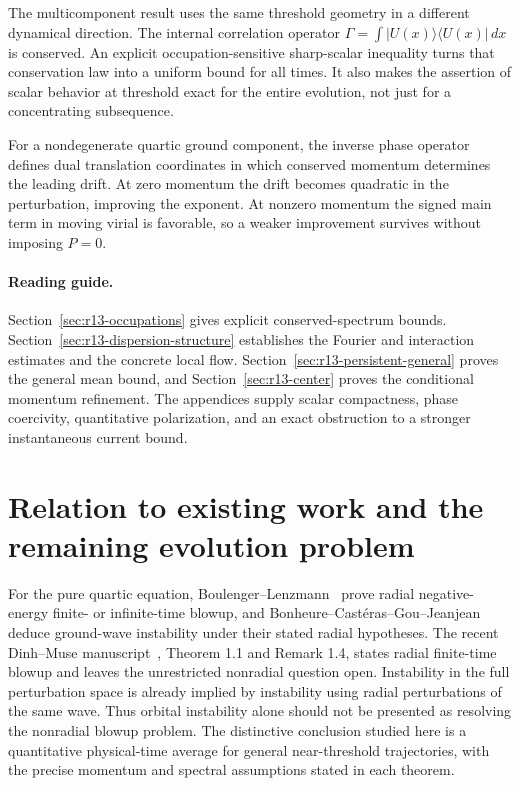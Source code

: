 \documentclass[11pt,a4paper]{article}
\theoremstyle{remark}\newtheorem{remark}[theorem]{Remark}
\begin{document}
The multicomponent result uses the same threshold geometry in a
different dynamical direction. The internal correlation operator
$\Gamma=\int|U(x)\rangle\langle U(x)|\,dx$ is conserved.
An explicit occupation-sensitive sharp-scalar inequality turns that
conservation law into a uniform bound for all times. It also makes
the assertion of scalar behavior at threshold exact for the entire
evolution, not just for a concentrating subsequence.

For a nondegenerate quartic ground component, the inverse phase
operator defines dual translation coordinates in which conserved
momentum determines the leading drift. At zero momentum the drift
becomes quadratic in the perturbation, improving the exponent. At
nonzero momentum the signed main term in moving virial is favorable,
so a weaker improvement survives without imposing $P=0$.

\paragraph{Reading guide.}
Section~\ref{sec:r13-occupations} gives explicit conserved-spectrum
bounds. Section~\ref{sec:r13-dispersion-structure} establishes the
Fourier and interaction estimates and the concrete local flow.
Section~\ref{sec:r13-persistent-general} proves the general mean
bound, and Section~\ref{sec:r13-center} proves the conditional
momentum refinement. The appendices supply scalar compactness,
phase coercivity, quantitative polarization, and an exact obstruction
to a stronger instantaneous current bound.






\section{Relation to existing work and the remaining evolution problem}
For the pure quartic equation, Boulenger--Lenzmann~\cite{BL} prove
radial negative-energy finite- or infinite-time blowup, and
Bonheure--Cast\'eras--Gou--Jeanjean~\cite{BCGJ} deduce ground-wave
instability under their stated radial hypotheses. The recent
Dinh--Muse manuscript~\cite{DM}, Theorem 1.1 and Remark 1.4, states
radial finite-time blowup and leaves the unrestricted nonradial
question open. Instability in the full perturbation space is already
implied by instability using radial perturbations of the same wave.
Thus orbital instability alone should not be presented as resolving
the nonradial blowup problem. The distinctive conclusion studied here
is a quantitative physical-time average for general near-threshold
trajectories, with the precise momentum and spectral assumptions
stated in each theorem.
\end{document}
